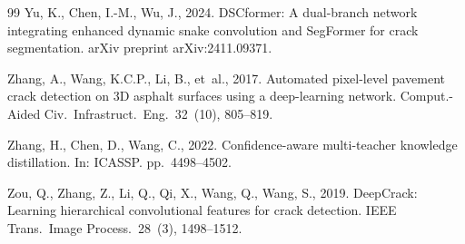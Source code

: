 \documentclass[review,authoryear]{elsarticle}
\begin{document}
\begin{thebibliography}{99}
Yu, K., Chen, I.-M., Wu, J., 2024.
\newblock DSCformer: A dual-branch network integrating enhanced dynamic snake convolution and SegFormer for crack segmentation.
\newblock arXiv preprint arXiv:2411.09371.

Zhang, A., Wang, K.C.P., Li, B., et~al., 2017.
\newblock Automated pixel-level pavement crack detection on 3D asphalt surfaces using a deep-learning network.
\newblock Comput.-Aided Civ.\ Infrastruct.\ Eng.\ 32~(10), 805--819.

Zhang, H., Chen, D., Wang, C., 2022.
\newblock Confidence-aware multi-teacher knowledge distillation.
\newblock In: ICASSP. pp.~4498--4502.

Zou, Q., Zhang, Z., Li, Q., Qi, X., Wang, Q., Wang, S., 2019.
\newblock DeepCrack: Learning hierarchical convolutional features for crack detection.
\newblock IEEE Trans.\ Image Process.\ 28~(3), 1498--1512.

\end{thebibliography}
\end{document}
